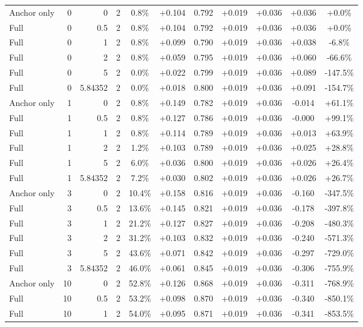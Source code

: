 \begin{table}[htbp]
\begin{tabular}{lrrrccccccc}
Anchor only & 0 & 0 & 2 & 0.8\% & +0.104 & 0.792 & +0.019 & +0.036 & +0.036 & +0.0\% \\
Full & 0 & 0.5 & 2 & 0.8\% & +0.104 & 0.792 & +0.019 & +0.036 & +0.036 & +0.0\% \\
Full & 0 & 1 & 2 & 0.8\% & +0.099 & 0.790 & +0.019 & +0.036 & +0.038 & -6.8\% \\
Full & 0 & 2 & 2 & 0.8\% & +0.059 & 0.795 & +0.019 & +0.036 & +0.060 & -66.6\% \\
Full & 0 & 5 & 2 & 0.0\% & +0.022 & 0.799 & +0.019 & +0.036 & +0.089 & -147.5\% \\
Full & 0 & 5.84352 & 2 & 0.0\% & +0.018 & 0.800 & +0.019 & +0.036 & +0.091 & -154.7\% \\
Anchor only & 1 & 0 & 2 & 0.8\% & +0.149 & 0.782 & +0.019 & +0.036 & -0.014 & +61.1\% \\
Full & 1 & 0.5 & 2 & 0.8\% & +0.127 & 0.786 & +0.019 & +0.036 & -0.000 & +99.1\% \\
Full & 1 & 1 & 2 & 0.8\% & +0.114 & 0.789 & +0.019 & +0.036 & +0.013 & +63.9\% \\
Full & 1 & 2 & 2 & 1.2\% & +0.103 & 0.789 & +0.019 & +0.036 & +0.025 & +28.8\% \\
Full & 1 & 5 & 2 & 6.0\% & +0.036 & 0.800 & +0.019 & +0.036 & +0.026 & +26.4\% \\
Full & 1 & 5.84352 & 2 & 7.2\% & +0.030 & 0.802 & +0.019 & +0.036 & +0.026 & +26.7\% \\
Anchor only & 3 & 0 & 2 & 10.4\% & +0.158 & 0.816 & +0.019 & +0.036 & -0.160 & -347.5\% \\
Full & 3 & 0.5 & 2 & 13.6\% & +0.145 & 0.821 & +0.019 & +0.036 & -0.178 & -397.8\% \\
Full & 3 & 1 & 2 & 21.2\% & +0.127 & 0.827 & +0.019 & +0.036 & -0.208 & -480.3\% \\
Full & 3 & 2 & 2 & 31.2\% & +0.103 & 0.832 & +0.019 & +0.036 & -0.240 & -571.3\% \\
Full & 3 & 5 & 2 & 43.6\% & +0.071 & 0.842 & +0.019 & +0.036 & -0.297 & -729.0\% \\
Full & 3 & 5.84352 & 2 & 46.0\% & +0.061 & 0.845 & +0.019 & +0.036 & -0.306 & -755.9\% \\
Anchor only & 10 & 0 & 2 & 52.8\% & +0.126 & 0.868 & +0.019 & +0.036 & -0.311 & -768.9\% \\
Full & 10 & 0.5 & 2 & 53.2\% & +0.098 & 0.870 & +0.019 & +0.036 & -0.340 & -850.1\% \\
Full & 10 & 1 & 2 & 54.0\% & +0.095 & 0.871 & +0.019 & +0.036 & -0.341 & -853.5\% \\

\end{tabular}
\end{table}
